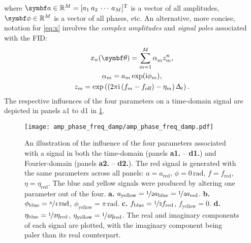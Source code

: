 where $\bda \in \mathbb{R}^M = [a_1 \hspace{2pt} a_2 \hspace{2pt} \cdots
\hspace{2pt} a_M]^{\mathrm{T}}$ is a vector of all amplitudes, $\bdphi \in
\mathbb{R}^M$ is a vector of all phases, etc.
An alternative, more concise, notation for \cref{eq:x}
involves the \emph{complex amplitudes} and \emph{signal poles} associated with
the \ac{FID}:
\begin{subequations}
    \begin{gather}
        x_n(\bth) = \sumM \alpha_m^{\vphantom{n}} z_m^n,\\
        \alpha_m = \amexpphim,\\
        z_m = \exp\left(
            \left(2 \pi \iu \left(f_m - \foff\right) - \eta_m\right) \Dt
        \right).\label{eq:signal-pole}
    \end{gather}
    \label{eq:x-alpha-z}%
\end{subequations}
The respective influences of the four parameters on a time-domain signal are
depicted in panels a1 to d1 in \cref{fig:amp-phase-freq-damp}.
\begin{figure}
    \centering
    \texttt{[image: amp\_phase\_freq\_damp/amp\_phase\_freq\_damp.pdf]}
    \caption[
        An illustration of the influence of the four parameters associated
        with a signal in both the time-domain nels and Fourier-domain.
    ]{
        An illustration of the influence of the four parameters associated
        with a signal in both the time-domain (panels \textbf{a1.} --
        \textbf{d1.}) and Fourier-domain (panels \textbf{a2.} -- \textbf{d2.}).
        The red signal is generated with the same parameters across all panels:
        $a = a_{\text{red}}$, $\phi = 0\,\unit{\radian}$, $f = f_{\text{red}}$,  $\eta =
        \eta_{\text{red}}$.  The blue and yellow signals were produced by
        altering one parameter out of the four.
        \textbf{a.} $a_{\text{yellow}} = \nicefrac{1}{2} a_{\text{blue}} =
        \nicefrac{1}{4} a_{\text{red}}$.
        \textbf{b.}
        $\phi_{\text{blue}} = \nicefrac{\pi}{4}\,\unit{\radian}$,
        $\phi_{\text{yellow}} = \pi\,\unit{\radian}$.
        \textbf{c.}
        $f_{\text{blue}} = \nicefrac{1}{2} f_{\text{red}}$,
        $f_{\text{yellow}} = 0$.
        \textbf{d.}
        $\eta_{\text{blue}} = \nicefrac{1}{2}\eta_{\text{red}}$,
        $\eta_{\text{yellow}} = \nicefrac{1}{4}\eta_{\text{red}}$.
        The real and imaginary components of each signal are plotted, with the
        imaginary component being paler than its real counterpart.
    }
    \label{fig:amp-phase-freq-damp}%
\end{figure}

